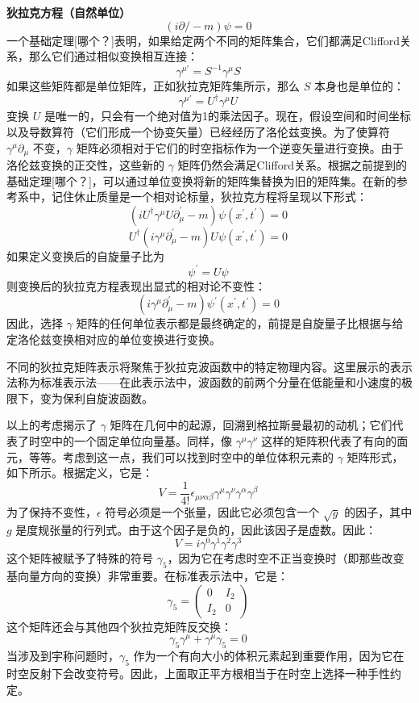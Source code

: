 \textbf{狄拉克方程（自然单位）}
\[
(i \partial / - m) \psi = 0~
\]
一个基础定理[哪个？]表明，如果给定两个不同的矩阵集合，它们都满足Clifford关系，那么它们通过相似变换相互连接：
\[
\gamma^{\mu \prime} = S^{-1} \gamma^{\mu} S~
\]
如果这些矩阵都是单位矩阵，正如狄拉克矩阵集所示，那么 \( S \) 本身也是单位的：
\[
\gamma^{\mu \prime} = U^{\dagger} \gamma^{\mu} U~
\]
变换 \( U \) 是唯一的，只会有一个绝对值为1的乘法因子。现在，假设空间和时间坐标以及导数算符（它们形成一个协变矢量）已经经历了洛伦兹变换。为了使算符 \(\gamma^{\mu} \partial_{\mu}\) 不变，\(\gamma\) 矩阵必须相对于它们的时空指标作为一个逆变矢量进行变换。由于洛伦兹变换的正交性，这些新的 \(\gamma\) 矩阵仍然会满足Clifford关系。根据之前提到的基础定理[哪个？]，可以通过单位变换将新的矩阵集替换为旧的矩阵集。在新的参考系中，记住休止质量是一个相对论标量，狄拉克方程将呈现以下形式：
\[
\left( iU^{\dagger} \gamma^{\mu} U \partial_{\mu}^{\prime} - m \right) \psi (x^{\prime}, t^{\prime}) = 0~
\]
\[
U^{\dagger} (i \gamma^{\mu} \partial_{\mu}^{\prime} - m) U \psi (x^{\prime}, t^{\prime}) = 0~
\]
如果定义变换后的自旋量子比为
\[
\psi^{\prime} = U \psi~
\]
则变换后的狄拉克方程表现出显式的相对论不变性：
\[
\left( i \gamma^{\mu} \partial_{\mu}^{\prime} - m \right) \psi^{\prime} (x^{\prime}, t^{\prime}) = 0~
\]
因此，选择 \(\gamma\) 矩阵的任何单位表示都是最终确定的，前提是自旋量子比根据与给定洛伦兹变换相对应的单位变换进行变换。

不同的狄拉克矩阵表示将聚焦于狄拉克波函数中的特定物理内容。这里展示的表示法称为标准表示法——在此表示法中，波函数的前两个分量在低能量和小速度的极限下，变为保利自旋波函数。

以上的考虑揭示了 \(\gamma\) 矩阵在几何中的起源，回溯到格拉斯曼最初的动机；它们代表了时空中的一个固定单位向量基。同样，像 \(\gamma^{\mu} \gamma^{\nu}\) 这样的矩阵积代表了有向的面元，等等。考虑到这一点，我们可以找到时空中的单位体积元素的 \(\gamma\) 矩阵形式，如下所示。根据定义，它是：
\[
V = \frac{1}{4!} \epsilon_{\mu \nu \alpha \beta} \gamma^{\mu} \gamma^{\nu} \gamma^{\alpha} \gamma^{\beta}~
\]
为了保持不变性，\(\epsilon\) 符号必须是一个张量，因此它必须包含一个 \(\sqrt{g}\) 的因子，其中 \(g\) 是度规张量的行列式。由于这个因子是负的，因此该因子是虚数。因此：
\[
V = i \gamma^{0} \gamma^{1} \gamma^{2} \gamma^{3}~
\]
这个矩阵被赋予了特殊的符号 \(\gamma_5\)，因为它在考虑时空不正当变换时（即那些改变基向量方向的变换）非常重要。在标准表示法中，它是：
\[
\gamma_5 = \begin{pmatrix} 0 & I_2 \\ I_2 & 0 \end{pmatrix}~
\]
这个矩阵还会与其他四个狄拉克矩阵反交换：
\[
\gamma_5 \gamma^{\mu} + \gamma^{\mu} \gamma_5 = 0~
\]
当涉及到宇称问题时，\(\gamma_5\) 作为一个有向大小的体积元素起到重要作用，因为它在时空反射下会改变符号。因此，上面取正平方根相当于在时空上选择一种手性约定。
